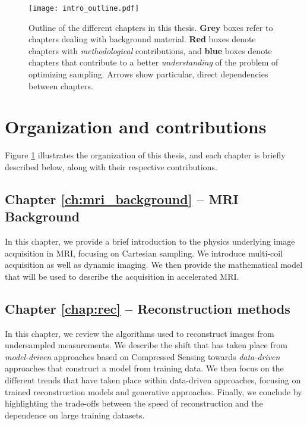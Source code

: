 \begin{figure}[!t]
    \centering
    \texttt{[image: intro\_outline.pdf]}
    \caption{Outline of the different chapters in this thesis. \textbf{Grey} boxes refer to chapters dealing with background material. \textbf{Red} boxes denote chapters with \textit{methodological} contributions, and \textbf{blue} boxes denote chapters that contribute to a better \textit{understanding} of the problem of optimizing sampling. Arrows show particular, direct dependencies between chapters.}\label{fig:organization}
    \vspace{-.5cm}
\end{figure}

\section*{Organization and contributions}
Figure \ref{fig:organization} illustrates the organization of this thesis, and each chapter is briefly described below, along with their respective contributions.

\subsection*{Chapter \ref{ch:mri_background} --  MRI Background}
In this chapter, we provide a brief introduction to the physics underlying image acquisition in MRI, focusing on {Cartesian} sampling. We introduce {multi-coil} acquisition as well as dynamic imaging. We then provide the mathematical model that will be used to describe the acquisition in accelerated MRI. 

\subsection*{Chapter \ref{chap:rec} -- Reconstruction methods}
In this chapter, we review the algorithms used to reconstruct images from undersampled measurements. We describe the shift that has taken place from {\textit{model-driven}} approaches based on Compressed Sensing \citep{lustig2007sparse} towards {\textit{data-driven}} approaches that construct a model from training data. We then focus on the different trends that have taken place within data-driven approaches, focusing on trained reconstruction models and generative approaches. Finally, we conclude by highlighting the trade-offs between the {speed of reconstruction} and the dependence on large training datasets.

